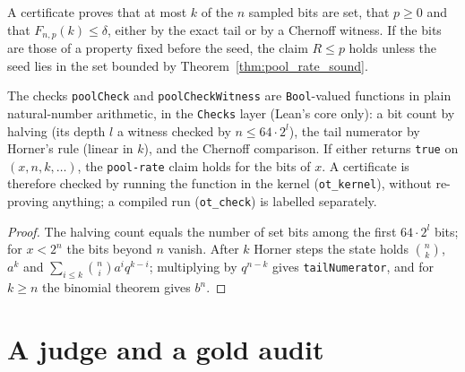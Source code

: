 \begin{definition}\label{def:pool_rate_claim}
\leanok
{}
A certificate proves that at most $k$ of the $n$ sampled bits are set, that
$p\ge0$ and that $F_{n,p}(k)\le\delta$, either by the exact tail or by a
Chernoff witness. If the bits are those of a property fixed before the seed,
the claim $R\le p$ holds unless the seed lies in the set bounded by
Theorem~\ref{thm:pool_rate_sound}.
\end{definition}

\begin{lemma}\label{lem:pool_check}
\leanok
{}
The checks \texttt{poolCheck} and \texttt{poolCheckWitness} are \texttt{Bool}-valued functions
in plain natural-number arithmetic, in the \texttt{Checks} layer (Lean's core only): a bit count by halving
(its depth $l$ a witness checked by $n\le 64\cdot 2^l$),
the tail numerator by Horner's rule (linear in $k$), and the Chernoff comparison. If either returns \texttt{true} on $(x,n,k,\dots)$,
the \texttt{pool-rate} claim holds for the bits of $x$. A certificate is therefore checked by
running the function in the kernel (\texttt{ot\_kernel}), without re-proving anything; a compiled
run (\texttt{ot\_check}) is labelled separately.
\end{lemma}
\begin{proof}
\leanok
The halving count equals the number of set bits among the first $64\cdot2^l$ bits; for $x<2^n$
the bits beyond $n$ vanish. After $k$ Horner steps the state holds $\binom nk$, $a^k$ and
$\sum_{i\le k}\binom ni a^i q^{k-i}$; multiplying by $q^{n-k}$ gives \texttt{tailNumerator}, and for
$k\ge n$ the binomial theorem gives $b^n$.
\end{proof}

\section{A judge and a gold audit}

